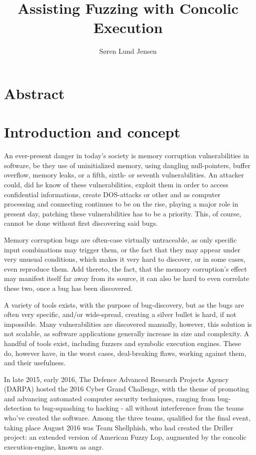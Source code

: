 \documentclass[a4paper]{article}
\title{Assisting Fuzzing with Concolic Execution}
\author{Søren Lund Jensen}
\begin{document}
\maketitle %

\tableofcontents

\newpage
\section{Abstract}
\label{sec:Abstract}

\newpage
\section{Introduction and concept}
\label{sec:Intro}
An ever-present danger in today's society is memory corruption vulnerabilities in software, be they use of uninitialized memory, using dangling null-pointers, buffer overflow, memory leaks, or a fifth, sixth- or seventh vulnerabilities. An attacker could, did he know of these vulnerabilities, exploit them in order to access confidential informations, create DOS-attacks or other and as computer processing and connecting continues to be on the rise, playing a major role in present day, patching these vulnerabilities has to be a priority. This, of course, cannot be done without first discovering said bugs. 

Memory corruption bugs are often-case virtually untraceable, as only specific input combinations may trigger them, or the fact that they may appear under very unusual conditions, which makes it very hard to discover, or in some cases, even reproduce them. Add thereto, the fact, that the memory corruption's effect may manifest itself far away from its source, it can also be hard to even correlate these two, once a bug has been discovered.

A variety of tools exists, with the purpose of bug-discovery, but as the bugs are often very specific, and/or wide-spread, creating a silver bullet is hard, if not impossible. Many vulnerabilities are discovered manually, however, this solution is not scalable, as software applications generally increase in size and complexity. A handful of tools exist, including fuzzers and symbolic execution engines. These do, however have, in the worst cases, deal-breaking flaws, working against them, and their usefulness.

In late 2015, early 2016, The Defence Advanced Research Projects Agency (DARPA) hosted the 2016 Cyber Grand Challenge, with the theme of promoting and advancing automated computer security techniques, ranging from bug-detection to bug-squashing to hacking - all without interference from the teams who've created the software. Among the three teams, qualified for the final event, taking place August 2016 was Team Shellphish, who had created the Driller project: an extended version of American Fuzzy Lop, augmented by the concolic execution-engine, known as angr.
\end{document}
